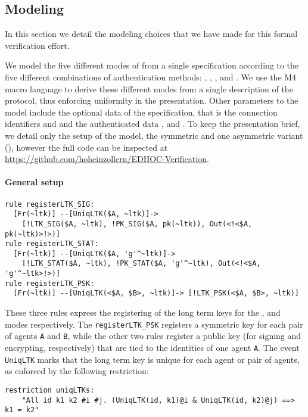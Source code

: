 \subsection{Modeling \mEdhoc}
In this section we detail the modeling choices that we have made for this formal
verification effort.
%

We model the five different modes of \mEdhoc{} from a single specification
according to the five different combinations of authentication methods:
\mPskPsk, \mSigSig, \mSigStat, \mStatSig and \mStatStat.
%
We use the M4 macro language to derive these different modes from a single
description of the protocol, thus enforcing uniformity in the presentation.
%
Other parameters to the model include the optional data of the \mEdhoc{}
specification, that is the connection identifiers \mCi and \mCr and
the authenticated data \mADone, \mADtwo and \mADthree.
%
To keep the presentation brief, we detail only the setup of the model,
the symmetric and one asymmetric variant (\mSigStat), however the full
code can be inspected at
\url{https://github.com/hoheinzollern/EDHOC-Verification}.



\paragraph{General setup}
\begin{lstlisting}
rule registerLTK_SIG:
  [Fr(~ltk)] --[UniqLTK($A, ~ltk)]->
    [!LTK_SIG($A, ~ltk), !PK_SIG($A, pk(~ltk)), Out(<!<$A, pk(~ltk)>!>)]
rule registerLTK_STAT:
  [Fr(~ltk)] --[UniqLTK($A, 'g'^~ltk)]->
    [!LTK_STAT($A, ~ltk), !PK_STAT($A, 'g'^~ltk), Out(<!<$A, 'g'^~ltk>!>)]
rule registerLTK_PSK:
  [Fr(~ltk)] --[UniqLTK(<$A, $B>, ~ltk)]-> [!LTK_PSK(<$A, $B>, ~ltk)]
\end{lstlisting}
    
These three rules express the registering of the long term keys for the \mSig,
\mStat and \mPsk modes respectively.
%
The \lstinline{registerLTK_PSK} registers a symmetric key for each pair of
agents \lstinline{A} and \lstinline{B}, while the other two rules register a
public key (for signing and encrypting, respectively) that are tied to the
identities of one agent \lstinline{A}.
%
The event \lstinline{UniqLTK} marks that the long term key is unique for each
agent or pair of agents, as enforced by the following restriction:
\begin{lstlisting}
restriction uniqLTKs:
    "All id k1 k2 #i #j. (UniqLTK(id, k1)@i & UniqLTK(id, k2)@j) ==> k1 = k2"
\end{lstlisting}

